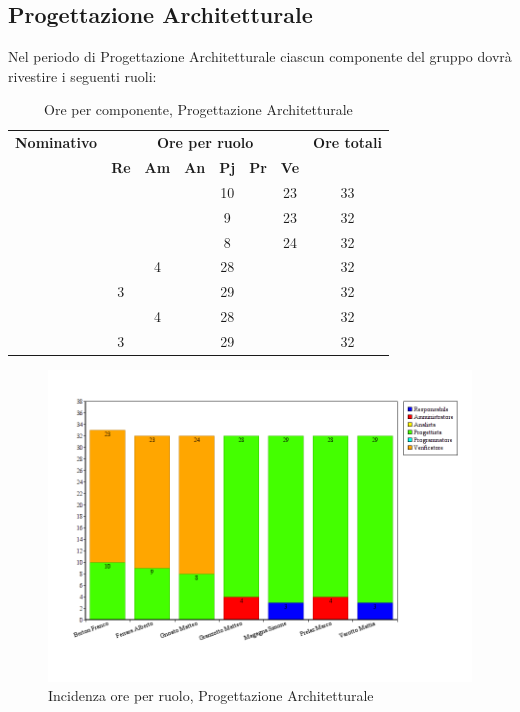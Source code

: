 \subsection{Progettazione Architetturale}
Nel periodo di Progettazione Architetturale ciascun componente del gruppo dovrà rivestire i seguenti ruoli:
\begin{table}[H]
	\begin{center}
		\begin{tabular}{|c|c|c|c|c|c|c|c|}
			\hline
			\textbf{Nominativo} & \multicolumn{6}{c|}{\textbf{Ore per ruolo}} & \textbf{Ore totali} \\
			& \textbf{Re} & \textbf{Am} & \textbf{An} & \textbf{Pj} & \textbf{Pr} & \textbf{Ve} & \\
			\hline
			\FB		&		&		&		&	10	&		&	23	&	33	\\
			\hline
			\AF	&		&		&		&	9 	&		&	23	& 	32	\\
			\hline
			\GN		&		&		&		&	8	&		&	24	&	32	\\
			\hline									
			\GR	&		&	 4	&  		&	28	&	 	& 		&	32	\\
			\hline
			\SM 		&	3	&		&		&	29	&		& 		&	32	\\
			\hline
			\MP 		& 		&	4	&		&	28	&		&		&	32	\\
			\hline						
			\MV 		&	3	&		&		&	29	&		&		& 	32	\\
			\hline
		\end{tabular}
	\end{center}
	\caption{Ore per componente, Progettazione Architetturale}
\end{table}

\begin{figure}[H]
	\centering
	\includegraphics[scale=0.4]{immagini/Grafi/GrafoPA}
	\caption{Incidenza ore per ruolo, Progettazione Architetturale}
\end{figure}

